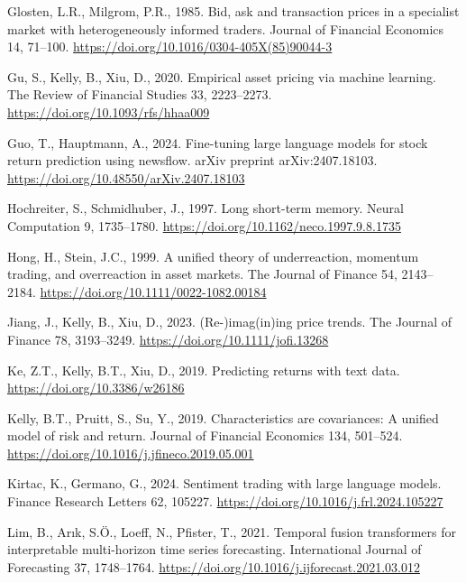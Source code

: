 \documentclass[
  11pt,
  a4paper,
]{article}
\newlength{\cslhangindent}
\newenvironment{CSLReferences}[2] %
 {\begin{list}{}{%
  \setlength{\itemindent}{0pt}
  \setlength{\leftmargin}{0pt}
  \setlength{\parsep}{0pt}
  \ifodd #1
   \setlength{\leftmargin}{\cslhangindent}
   \setlength{\itemindent}{-1\cslhangindent}
  \fi
  \setlength{\itemsep}{#2\baselineskip}}}
 {\end{list}}
\begin{document}
\begin{CSLReferences}{1}{0}
Glosten, L.R., Milgrom, P.R., 1985. Bid, ask and transaction prices in a
specialist market with heterogeneously informed traders. Journal of
Financial Economics 14, 71--100.
\url{https://doi.org/10.1016/0304-405X(85)90044-3}

Gu, S., Kelly, B., Xiu, D., 2020. Empirical asset pricing via machine
learning. The Review of Financial Studies 33, 2223--2273.
\url{https://doi.org/10.1093/rfs/hhaa009}

Guo, T., Hauptmann, A., 2024. Fine-tuning large language models for
stock return prediction using newsflow. arXiv preprint arXiv:2407.18103.
\url{https://doi.org/10.48550/arXiv.2407.18103}

Hochreiter, S., Schmidhuber, J., 1997. Long short-term memory. Neural
Computation 9, 1735--1780.
\url{https://doi.org/10.1162/neco.1997.9.8.1735}

Hong, H., Stein, J.C., 1999. A unified theory of underreaction, momentum
trading, and overreaction in asset markets. The Journal of Finance 54,
2143--2184. \url{https://doi.org/10.1111/0022-1082.00184}

Jiang, J., Kelly, B., Xiu, D., 2023. (Re-)imag(in)ing price trends. The
Journal of Finance 78, 3193--3249.
\url{https://doi.org/10.1111/jofi.13268}

Ke, Z.T., Kelly, B.T., Xiu, D., 2019. Predicting returns with text data.
\url{https://doi.org/10.3386/w26186}

Kelly, B.T., Pruitt, S., Su, Y., 2019. Characteristics are covariances:
A unified model of risk and return. Journal of Financial Economics 134,
501--524. \url{https://doi.org/10.1016/j.jfineco.2019.05.001}

Kirtac, K., Germano, G., 2024. Sentiment trading with large language
models. Finance Research Letters 62, 105227.
\url{https://doi.org/10.1016/j.frl.2024.105227}

Lim, B., Arık, S.Ö., Loeff, N., Pfister, T., 2021. Temporal fusion
transformers for interpretable multi-horizon time series forecasting.
International Journal of Forecasting 37, 1748--1764.
\url{https://doi.org/10.1016/j.ijforecast.2021.03.012}


\end{CSLReferences}
\end{document}
